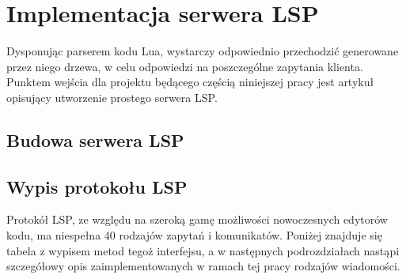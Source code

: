 \chapter{Implementacja serwera LSP}
Dysponując parserem kodu Lua, wystarczy odpowiednio przechodzić generowane przez niego drzewa, w celu odpowiedzi na poszczególne zapytania klienta. Punktem wejścia dla projektu będącego częścią niniejszej pracy jest artykuł \cite{lsp_sample} opisujący utworzenie prostego serwera LSP.

\section{Budowa serwera LSP}

\section{Wypis protokołu LSP}
Protokół LSP, ze względu na szeroką gamę możliwości nowoczesnych edytorów kodu, ma niespełna 40 rodzajów zapytań i komunikatów. Poniżej znajduje się tabela z wypisem metod tegoż interfejsu, a w następnych podrozdziałach nastąpi szczegółowy opis zaimplementowanych w ramach tej pracy rodzajów wiadomości.

